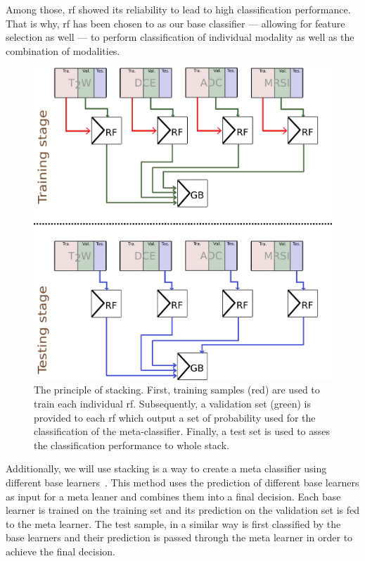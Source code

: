 Among those, \ac{rf} showed its reliability to lead to high classification performance.
That is why, \ac{rf} has been chosen to as our base classifier --- allowing for feature selection as well --- to perform classification of individual modality as well as the combination of modalities.

\begin{figure}
  \centering
  \includegraphics[width=0.5\linewidth]{6_pipeline/figures/stacking_gb.png}
  \caption[The principle of stacking.]{The principle of stacking. First, training samples (red) are used to train each individual \ac{rf}. Subsequently, a validation set (green) is provided to each \ac{rf} which output a set of probability used for the classification of the meta-classifier. Finally, a test set is used to asses the classification performance to whole stack.}
  \label{fig:stacking}
\end{figure}

Additionally, we will use stacking is a way to create a meta classifier using different base learners~\cite{wolpert1992stacked}.
This method uses the prediction of different base learners as input for a meta leaner and combines them into a final decision.
Each base learner is trained on the training set and its prediction on the validation set is fed to the meta learner.
The test sample, in a similar way is first classified by the base learners and their prediction is passed through the meta learner in order to achieve the final decision.
 
